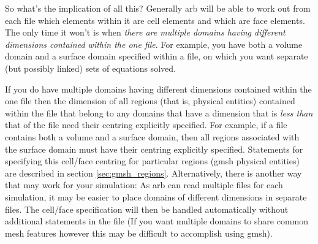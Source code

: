 So what's the implication of all this?  Generally arb will be able to work out from each  file which elements within it are cell elements and which are face elements.  The only time it won't is when \emph{there are multiple domains having different dimensions contained within the one  file}.  For example, you have both a volume domain and a surface domain specified within a  file, on which you want separate (but possibly linked) sets of equations solved.

If you do have multiple domains having different dimensions contained within the one file then the dimension of all regions (that is, physical entities) contained within the  file that belong to any domains that have a dimension that is \emph{less than} that of the  file need their centring explicitly specified.  For example, if a  file contains both a volume and a surface domain, then all regions associated with the surface domain must have their centring explicitly specified.  Statements for specifying this cell/face centring for particular regions (gmsh physical entities) are described in section \ref{sec:gmsh_regions}.  Alternatively, there is another way that may work for your simulation:  As arb can read multiple  files for each simulation, it may be easier to place domains of different dimensions in separate  files.  The cell/face specification will then be handled automatically without additional statements in the  file  (If you want multiple domains to share common mesh features however this may be difficult to accomplish using gmsh).









